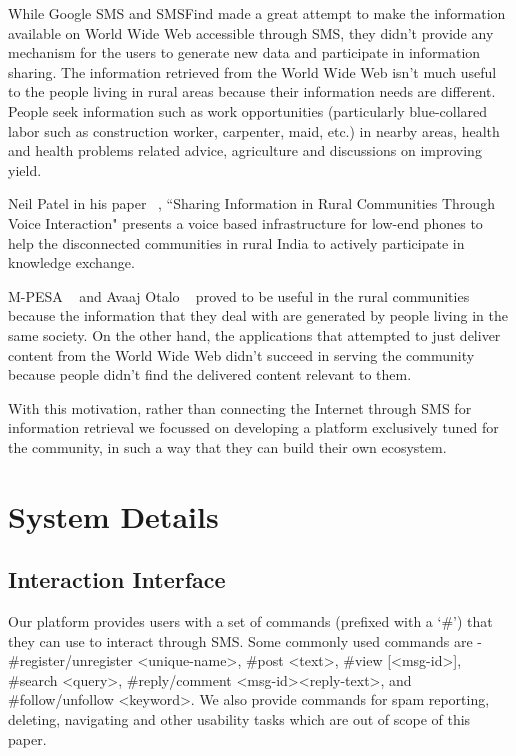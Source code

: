 \documentclass{chi-ext}
\begin{document}
While Google SMS and SMSFind made a great attempt to make the information available on World Wide Web  accessible through SMS, they didn't provide any mechanism for the users to generate new data and participate in information sharing. The information retrieved from the World Wide Web isn't much useful to the people living in rural areas because their information needs are different. People seek information such as work opportunities (particularly blue-collared labor such as construction worker, carpenter, maid, etc.) in nearby areas, health and health problems related advice, agriculture and discussions on improving yield.

Neil Patel in his paper ~\cite{Patel:2011:ACP:2046396.2046436}, ``Sharing Information in Rural Communities Through Voice Interaction" presents a voice based infrastructure for low-end phones to help the disconnected communities in rural India to actively participate in knowledge exchange. 

M-PESA ~\cite{NBERw16721} and Avaaj Otalo ~\cite{Patel:2010:AOF:1753326.1753434} proved to be useful in the rural communities because the information that they deal with are generated by people living in the same society. On the other hand, the applications that attempted to just deliver content from the World Wide Web didn't succeed in serving the community because people didn’t find the delivered content relevant to them. 

With this motivation, rather than connecting the Internet through SMS for information retrieval we focussed on developing a platform exclusively tuned for the community, in such a way that they can build their own ecosystem.

\section{System Details}
\subsection{Interaction Interface}
Our platform provides users with a set of commands (prefixed with a `\#') that they can use to interact through SMS. Some commonly used commands are -  \#register/unregister \textless unique-name\textgreater, \#post \textless text\textgreater, \#view [\textless msg-id\textgreater],  \#search \textless query\textgreater, \#reply/comment \textless msg-id\textgreater \textless reply-text\textgreater, and  \#follow/unfollow \textless keyword\textgreater. We also provide commands for spam reporting, deleting, navigating and other usability tasks which are out of scope of this paper.
\end{document}
